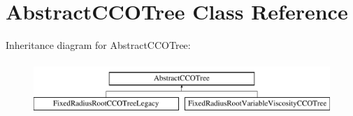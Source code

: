 \hypertarget{class_abstract_c_c_o_tree}{}\section{Abstract\+C\+C\+O\+Tree Class Reference}
\label{class_abstract_c_c_o_tree}
Inheritance diagram for Abstract\+C\+C\+O\+Tree\+:\begin{figure}[H]
\begin{center}
\leavevmode
\includegraphics[height=2.000000cm]{class_abstract_c_c_o_tree}
\end{center}
\end{figure}

